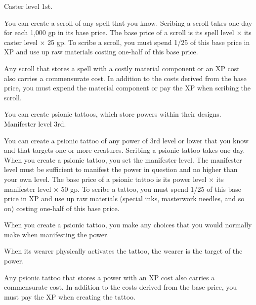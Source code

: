 {Caster level 1st.}
{You can create a scroll of any spell that you know. Scribing a scroll takes one day for each 1,000 gp in its base price. The base price of a scroll is its spell level $\times$ its caster level $\times$ 25 gp. To scribe a scroll, you must spend 1/25 of this base price in XP and use up raw materials costing one-half of this base price.

Any scroll that stores a spell with a costly material component or an XP cost also carries a commensurate cost. In addition to the costs derived from the base price, you must expend the material component or pay the XP when scribing the scroll.}

{You can create psionic tattoos, which store powers within their designs.}
{Manifester level 3rd.}
{You can create a psionic tattoo of any power of 3rd level or lower that you know and that targets one or more creatures. Scribing a psionic tattoo takes one day. When you create a psionic tattoo, you set the manifester level. The manifester level must be sufficient to manifest the power in question and no higher than your own level. The base price of a psionic tattoo is its power level $\times$ its manifester level $\times$ 50 gp. To scribe a tattoo, you must spend 1/25 of this base price in XP and use up raw materials (special inks, masterwork needles, and so on) costing one-half of this base price.

When you create a psionic tattoo, you make any choices that you would normally make when manifesting the power.

When its wearer physically activates the tattoo, the wearer is the target of the power.

Any psionic tattoo that stores a power with an XP cost also carries a commensurate cost. In addition to the costs derived from the base price, you must pay the XP when creating the tattoo.}{}{}